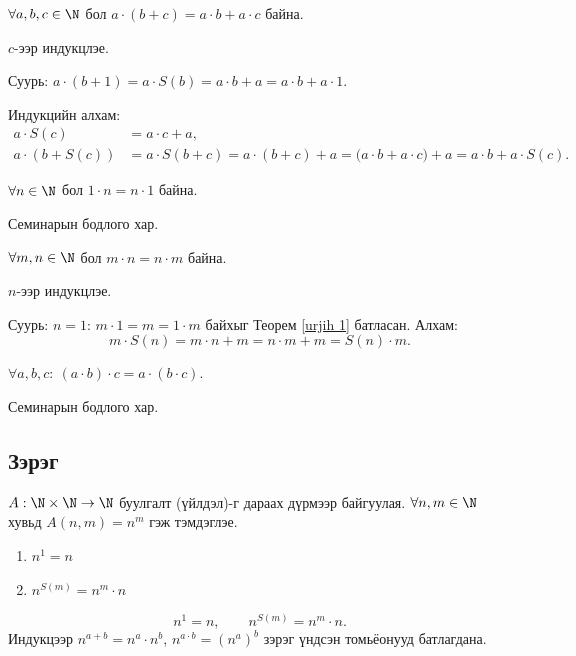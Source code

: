 \begin{theorem}[Дистрибутив]\label{distributive}
$\forall a,b,c\in\N$ бол $a\cdot(b+c)=a\cdot b+a\cdot c$ байна.
\end{theorem}
\begin{prof}
$c$-ээр индукцлэе. 

Суурь: $a\cdot(b+1)=a\cdot S(b)=a\cdot b+a=a\cdot b+a\cdot 1$. 

Индукцийн алхам:
\begin{align*}
a\cdot S(c)&=a\cdot c+a,\\
a\cdot(b+S(c))&=a\cdot S(b+c)=a\cdot(b+c)+a=\big(a\cdot b+a\cdot c\big)+a= a\cdot b+a\cdot S(c).
\end{align*}
\end{prof}
\begin{theorem}\label{urjih 1}
$\forall n\in\N$ бол $1\cdot n=n\cdot 1$ байна.
\end{theorem}
\begin{prof}
     Семинарын бодлого хар.
\end{prof}
\begin{theorem}
$\forall m,n\in\N$ бол $ m\cdot n=n\cdot m$ байна.
\end{theorem}
\begin{prof}
$n$-ээр индукцлэе. 

Суурь: $n=1$: $m\cdot 1=m=1\cdot m$ байхыг Теорем \ref{urjih 1} батласан. 
Алхам:
\[m\cdot S(n)=m\cdot n+m= n\cdot m+m=S(n)\cdot m.\]
\end{prof}

\begin{theorem}
$\forall a,b,c:\ (a\cdot b)\cdot c=a\cdot(b\cdot c)$.
\end{theorem}
\begin{prof}
     Семинарын бодлого хар.
\end{prof}

\subsection{Зэрэг}
 \begin{definition}[Зэрэг] $ A: \N\times \N\to\N$ буулгалт (үйлдэл)-г дараах дүрмээр байгуулая. $\forall n , m\in\N$ хувьд $A(n,m)=n^ m$ гэж тэмдэглэе.
\begin{enumerate}[label=\textbf{Z\arabic*})]
    \item $ n^1= n$
    \item $n^{S(m)}=n^ m\cdot n$
\end{enumerate} 
\end{definition}
\[n^{1}=n,\qquad n^{S(m)}=n^{m}\cdot n.\]
Индукцээр $n^{a+b}=n^a\cdot n^b$, $n^{a\cdot b}=(n^a)^b$ зэрэг үндсэн томьёонууд батлагдана.

